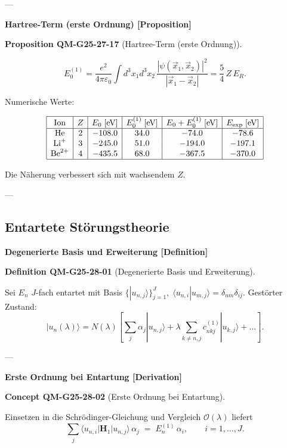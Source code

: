 \documentclass[10pt, letterpaper]{article}
\newcommand{\CustomHeading}[3]{%
  \par\medskip\noindent%
  \textbf{#1 #2} \textnormal{(#3)}.\enskip%
}
\newenvironment{DEF}[2]{\begin{unitbox}\CustomHeading{Definition}{#1}{#2}}{\end{unitbox}}
\newenvironment{PROP}[2]{\begin{unitbox}\CustomHeading{Proposition}{#1}{#2}}{\end{unitbox}}
\newenvironment{CONC}[2]{\begin{unitbox}\CustomHeading{Concept}{#1}{#2}}{\end{unitbox}}
\begin{document}
---

\textbf{Hartree-Term (erste Ordnung) [Proposition]}

\begin{PROP}{QM-G25-27-17}{Hartree-Term (erste Ordnung)}
\[
E_0^{(1)} =
\frac{e^{2}}{4\pi\varepsilon_0}\!
\int d^{3}x_1 d^{3}x_2\,
\frac{|\psi(\vec x_1,\vec x_2)|^{2}}
{|\vec x_1-\vec x_2|}
=
\frac{5}{4}\,Z\,E_R.
\]

Numerische Werte:

\[
\begin{array}{|c|c|c|c|c|c|}
\hline
\text{Ion} & Z &
E_0\;[\text{eV}] &
E_0^{(1)}\;[\text{eV}] &
E_0+E_0^{(1)}\;[\text{eV}] &
E_{\text{exp}}\;[\text{eV}]\\
\hline
\text{He} & 2 & -108.0 & 34.0 & -74.0 & -78.6\\
\text{Li}^+ & 3 & -245.0 & 51.0 & -194.0 & -197.1\\
\text{Be}^{2+} & 4 & -435.5 & 68.0 & -367.5 & -370.0\\
\hline
\end{array}
\]

Die Näherung verbessert sich mit wachsendem $Z$.
\end{PROP}

---

\subsection{Entartete Störungstheorie}



\textbf{Degenerierte Basis und Erweiterung [Definition]}

\begin{DEF}{QM-G25-28-01}{Degenerierte Basis und Erweiterung}
Sei $E_n$ $J$-fach entartet mit Basis
\(
\{|u_{n,j}\rangle\}_{j=1}^{J},
\;
\langle u_{n,i}|u_{m,j}\rangle=\delta_{nm}\delta_{ij}.
\)
Gestörter Zustand:
\[
|u_n(\lambda)\rangle =
N(\lambda)\!\left[
\sum_{j}\alpha_j |u_{n,j}\rangle
+ \lambda\!\!\sum_{k\neq n,j} c_{nkj}^{(1)} |u_{k,j}\rangle + \dots
\right].
\]
\end{DEF}

---

\textbf{Erste Ordnung bei Entartung [Derivation]}

\begin{CONC}{QM-G25-28-02}{Erste Ordnung bei Entartung}
Einsetzen in die Schrödinger-Gleichung und Vergleich $\mathcal{O}(\lambda)$ liefert
\[
\sum_{j}\langle u_{n,i}|\mathbf{H}_1|u_{n,j}\rangle\,\alpha_j
\;=\;
E_{n}^{(1)}\,\alpha_i,
\qquad
i=1,\dots,J.
\]
\end{CONC}
\end{document}
